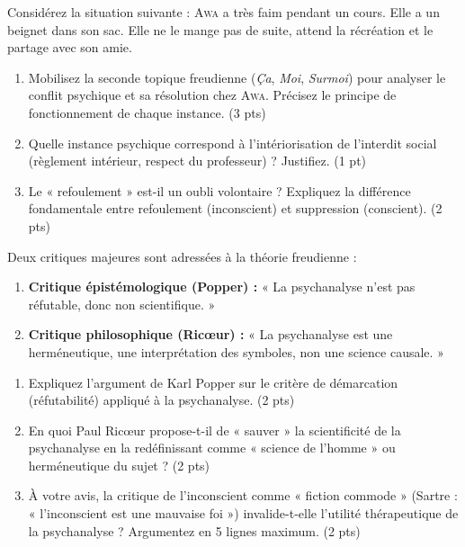 \documentclass[11pt]{article}
\begin{document}
\begin{exercice}
Considérez la situation suivante : \textsc{Awa} a très faim pendant un cours. Elle a un beignet dans son sac. Elle ne le mange pas de suite, attend la récréation et le partage avec son amie.
\begin{enumerate}
    \item Mobilisez la seconde topique freudienne (\textit{Ça}, \textit{Moi}, \textit{Surmoi}) pour analyser le conflit psychique et sa résolution chez \textsc{Awa}. Précisez le principe de fonctionnement de chaque instance. (3 pts)
    \item Quelle instance psychique correspond à l'intériorisation de l'interdit social (règlement intérieur, respect du professeur) ? Justifiez. (1 pt)
    \item Le « refoulement » est-il un oubli volontaire ? Expliquez la différence fondamentale entre refoulement (inconscient) et suppression (conscient). (2 pts)
\end{enumerate}
\end{exercice}

\begin{exercice}
Deux critiques majeures sont adressées à la théorie freudienne :
\begin{enumerate}
    \item \textbf{Critique épistémologique (Popper) :} « La psychanalyse n'est pas réfutable, donc non scientifique. »
    \item \textbf{Critique philosophique (Ricœur) :} « La psychanalyse est une herméneutique, une interprétation des symboles, non une science causale. »
\end{enumerate}
\begin{enumerate}
    \item Expliquez l'argument de Karl Popper sur le critère de démarcation (réfutabilité) appliqué à la psychanalyse. (2 pts)
    \item En quoi Paul Ricœur propose-t-il de « sauver » la scientificité de la psychanalyse en la redéfinissant comme « science de l'homme » ou herméneutique du sujet ? (2 pts)
    \item À votre avis, la critique de l'inconscient comme « fiction commode » (Sartre : « l'inconscient est une mauvaise foi ») invalide-t-elle l'utilité thérapeutique de la psychanalyse ? Argumentez en 5 lignes maximum. (2 pts)
\end{enumerate}
\end{exercice}
\end{document}
